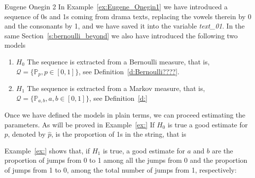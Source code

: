 	\begin{example}{Eugene Onegin 2 }
		\label{e:Eugene_Onegin2}
		In Example~\ref{ex:Eugene_Onegin1} we have introduced a sequence of 0s and 1s coming from drama texts, replacing the vowels therein by 0 and the consonants by 1, and we have saved it into the variable \textit{text\_01}. In the same Section~\ref{s:bernoulli_beyond} we also have introduced the following two models
		\begin{enumerate}
			\item \label{item:model_bernoulli} $H_0$  The sequence is extracted from a Bernoulli measure, that is, $\mathcal Q = \{ \mathbb P_p, p \in [0,1]\}$, see Definition~\ref{d:Bernoulli????}.
			\item \label{item:model_markov} $H_1$ The sequence is extracted from a Markov measure, that is, $\mathcal Q = \{ \mathbb P_{a,b}, a, b \in [0,1]\}$, see Definition~\ref{d:}
		\end{enumerate} 
		Once we have defined the models in plain terms, we can proceed estimating the parameters. As will be proved in Example~\ref{ex:} If $H_0$ is true a good estimate for $p$, denoted by  $\hat p$, is the proportion of 1s in the string, that is 
\begin{knitrout}
\color{fgcolor}\begin{kframe}
\begin{alltt}
 \hlkwb{<-} 
\end{alltt}


{\ttfamily\noindent\bfseries\color{errorcolor}{\#\# Error in mean(text\_01): oggetto 'text\_01' non trovato}}\end{kframe}
\end{knitrout}
		Example~\ref{ex:} shows that, if $H_1$ is true, a good estimate for $a$ and $b$ are the proportion of jumps from 0 to 1 among all the jumps from 0 and the proportion of jumps from 1 to 0, among the total number of jumps from 1, respectively:  
\begin{knitrout}
\color{fgcolor}\begin{kframe}
\begin{alltt}
 \hlkwb{<-}  \hlopt{==}  \hlopt{&}  \hlopt{==} \hldef{)}
\end{alltt}


{\ttfamily\noindent\bfseries\color{errorcolor}{\#\# Error: oggetto 'from' non trovato}}\begin{alltt}
 \hlkwb{<-}  \hlopt{==}  \hlopt{&}  \hlopt{==} \hldef{)}
\end{alltt}



\end{kframe}
\end{knitrout}
\end{example}
